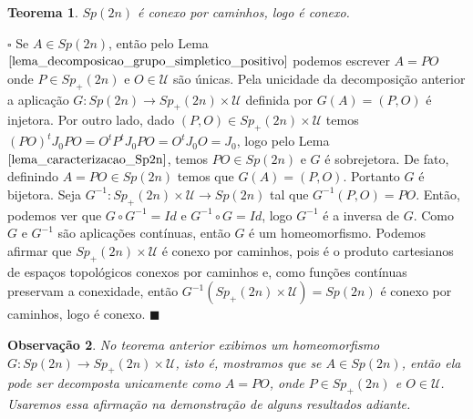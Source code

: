 \documentclass[12pt]{book}
\newtheorem{teorema}{Teorema}[section]
\newtheorem{observacao}[teorema]{Observação}
\newenvironment{prova}[1]{$\square$ #1}{\hfill$\blacksquare$}
\newcommand{\estruturacomplexa}{J_{0}}
\newcommand{\gruposimpletico}[1]{Sp(#1)}
\newcommand{\gruposimpleticopositivo}[1]{Sp_{+}(#1)}
\newcommand{\matrizSimpleticaOrtogonal}{\mathcal{U}}
\begin{document}
	\begin{teorema}\label{teoerma_sp2n_conexo}
		$\gruposimpletico{2n}$ é conexo por caminhos, logo é conexo.
	\end{teorema}
	\begin{prova}
		Se $A \in \gruposimpletico{2n}$, então pelo Lema $\ref{lema_decomposicao_grupo_simpletico_positivo}$ podemos escrever $A=PO$ onde $P \in \gruposimpleticopositivo{2n}$ e $O\in \matrizSimpleticaOrtogonal$ são únicas. Pela unicidade da decomposição anterior a aplicação $G: \gruposimpletico{2n} \to \gruposimpleticopositivo{2n} \times \matrizSimpleticaOrtogonal$ definida por $G(A) = (P,O)$ é injetora. Por outro lado, dado $(P,O) \in \gruposimpleticopositivo{2n} \times \matrizSimpleticaOrtogonal$ temos $(PO)^{t}\estruturacomplexa PO = O^{t}P^{t}\estruturacomplexa PO = O^{t}\estruturacomplexa O = \estruturacomplexa$, logo pelo Lema $\ref{lema_caracterizacao_Sp2n}$, temos $PO \in \gruposimpletico{2n}$ e $G$ é sobrejetora. De fato, definindo $A=PO \in \gruposimpletico{2n}$ temos que $G(A) = (P,O)$. Portanto $G$ é bijetora. Seja $G^{-1}:\gruposimpleticopositivo{2n} \times \matrizSimpleticaOrtogonal\to \gruposimpletico{2n}$ tal que $G^{-1}(P,O) = PO$. Então, podemos ver que $G\circ G^{-1} = Id$ e $G^{-1} \circ G= Id$, logo $G^{-1} $ é a inversa de $G$. Como $G$ e $G^{-1} $ são aplicações contínuas, então $G$ é um homeomorfismo. Podemos afirmar que $\gruposimpleticopositivo{2n}\times \matrizSimpleticaOrtogonal$ é conexo por caminhos, pois é o produto cartesianos de espaços topológicos conexos por caminhos e, como funções contínuas preservam a conexidade, então $G^{-1}(\gruposimpleticopositivo{2n}\times \matrizSimpleticaOrtogonal) = \gruposimpletico{2n}$ é conexo por caminhos, logo é conexo.
	\end{prova}
	
	\begin{observacao}\label{observacao_decomposicao_Sp2n}
		No teorema anterior exibimos um homeomorfismo $G:\gruposimpletico{2n} \to \gruposimpleticopositivo{2n} \times \matrizSimpleticaOrtogonal$, isto é, mostramos que se $A \in \gruposimpletico{2n}$, então ela pode ser decomposta unicamente como $A=PO$, onde $P\in \gruposimpleticopositivo{2n}$ e $O \in \matrizSimpleticaOrtogonal$. Usaremos essa afirmação na demonstração de alguns resultados adiante.
	\end{observacao}
	
\end{document}

